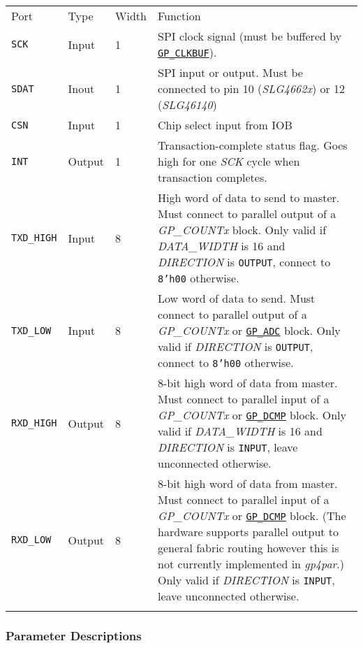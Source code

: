 \documentclass[11pt]{article}
\newcommand{\namestyle}[1]{\textit{#1}}
\newcommand{\tokenstyle}[1]{\texttt{#1}}
\newcommand{\valuestyle}[1]{\texttt{#1}}
\newcommand{\strvaluestyle}[1]{\valuestyle{\textquotedbl#1\textquotedbl}}
\newcommand{\whenstyle}[1]{{\fontseries{sb}\selectfont#1}}
\newcommand{\tokenref}[2]{\hyperref[#2]{\tokenstyle{#1}}}
\newcommand{\thinhline}{\Xhline{1\arrayrulewidth}}
\newcommand{\thickhline}{\Xhline{2.5\arrayrulewidth}}
\begin{document}
\begin{tabularx}{\textwidth}{lllX}
\thinhline
\whenstyle{Port} & \whenstyle{Type} & \whenstyle{Width} & \whenstyle{Function} \\
\thickhline
\tokenstyle{SCK} & Input & 1 & SPI clock signal (must be buffered by \tokenref{GP\_CLKBUF}{gp-clkbuf}). \\
\thinhline
\tokenstyle{SDAT} & Inout & 1 & SPI input or output. Must be connected to pin 10 (\namestyle{SLG4662x}) or
12 (\namestyle{SLG46140}) \\
\thinhline
\tokenstyle{CSN} & Input & 1 & Chip select input from IOB\\
\thinhline
\tokenstyle{INT} & Output & 1 & Transaction-complete status flag. Goes high for one \namestyle{SCK} cycle when transaction
completes. \\
\thinhline
\tokenstyle{TXD\_HIGH} & Input & 8 & High word of data to send to master. Must connect to parallel output of a
\namestyle{GP\_COUNTx} block. Only valid if \namestyle{DATA\_WIDTH} is 16 and \namestyle{DIRECTION} is
\strvaluestyle{OUTPUT}, connect to \valuestyle{8'h00} otherwise.\\
\thinhline
\tokenstyle{TXD\_LOW} & Input & 8 &  Low word of data to send. Must connect to parallel output of a \namestyle{GP\_COUNTx}
or \tokenref{GP\_ADC}{gp-adc} block. Only valid if \namestyle{DIRECTION} is \strvaluestyle{OUTPUT}, connect to
\valuestyle{8'h00} otherwise.\\
\thinhline
\tokenstyle{RXD\_HIGH} & Output & 8 & 8-bit high word of data from master. Must connect to parallel input of a
\namestyle{GP\_COUNTx} or \tokenref{GP\_DCMP}{gp-dcmp} block. Only valid if \namestyle{DATA\_WIDTH} is 16 and
\namestyle{DIRECTION} is \strvaluestyle{INPUT}, leave unconnected otherwise.\\
\thinhline
\tokenstyle{RXD\_LOW} & Output & 8 & 8-bit high word of data from master. Must connect to parallel input of a
\namestyle{GP\_COUNTx} or \tokenref{GP\_DCMP}{gp-dcmp} block. (The hardware supports parallel output to general fabric
routing however this is not currently implemented in \namestyle{gp4par}.) Only valid if \namestyle{DIRECTION} is
\strvaluestyle{INPUT}, leave unconnected otherwise.\\
\thinhline
\end{tabularx}

\subsubsection{Parameter Descriptions}
\end{document}
